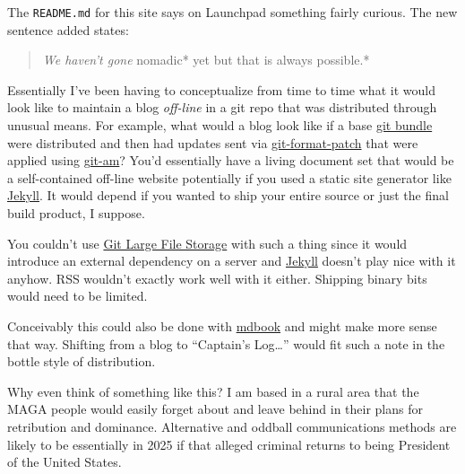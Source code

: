 The \texttt{README.md} for this site says on Launchpad something fairly
curious. The new sentence added states:

\begin{quote}
\emph{We haven't gone }nomadic* yet but that is always possible.*
\end{quote}

Essentially I've been having to conceptualize from time to time what it
would look like to maintain a blog \emph{off-line} in a git repo that
was distributed through unusual means. For example, what would a blog
look like if a base \href{https://www.git-scm.com/docs/git-bundle}{git
bundle} were distributed and then had updates sent via
\href{https://git-scm.com/docs/git-format-patch}{git-format-patch} that
were applied using \href{https://git-scm.com/docs/git-am}{git-am}? You'd
essentially have a living document set that would be a self-contained
off-line website potentially if you used a static site generator like
\href{https://jekyllrb.com}{Jekyll}. It would depend if you wanted to
ship your entire source or just the final build product, I suppose.

You couldn't use \href{https://git-lfs.com}{Git Large File Storage} with
such a thing since it would introduce an external dependency on a server
and \href{https://jekyllrb.com}{Jekyll} doesn't play nice with it
anyhow. RSS wouldn't exactly work well with it either. Shipping binary
bits would need to be limited.

Conceivably this could also be done with
\href{https://rust-lang.github.io/mdBook/}{mdbook} and might make more
sense that way. Shifting from a blog to ``Captain's Log\ldots{}'' would
fit such a note in the bottle style of distribution.

Why even think of something like this? I am based in a rural area that
the MAGA people would easily forget about and leave behind in their
plans for retribution and dominance. Alternative and oddball
communications methods are likely to be essentially in 2025 if that
alleged criminal returns to being President of the United States.
